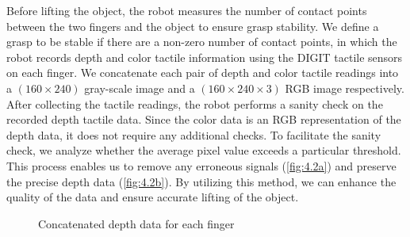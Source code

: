 \documentclass[12pt, a4paper]{report}
\theoremstyle{definition}
\begin{document}
Before lifting the object, the robot measures the number of contact points between the two fingers and the object to ensure grasp stability. We define a grasp to be stable if there are a non-zero number of contact points, in which the robot records depth and color tactile information using the DIGIT tactile sensors on each finger. We concatenate each pair of depth and color tactile readings into a $(160\times240)$ gray-scale image and a $(160\times240\times3)$ RGB image respectively.\\

After collecting the tactile readings, the robot performs a sanity check on the recorded depth tactile data. Since the color data is an RGB representation of the depth data, it does not require any additional checks. To facilitate the sanity check, we analyze whether the average pixel value exceeds a particular threshold. This process enables us to remove any erroneous signals (\ref{fig:4.2a}) and preserve the precise depth data (\ref{fig:4.2b}). By utilizing this method, we can enhance the quality of the data and ensure accurate lifting of the object.
\begin{figure}[H]%
    \centering
    \qquad
    \caption{Concatenated depth data for each finger}%
    \label{fig:4.2}%
\end{figure}
\end{document}
